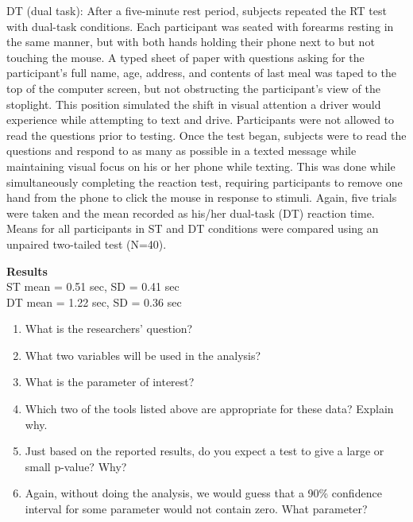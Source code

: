 \begin{alist}
\begin{list}{}{}
    DT (dual task): After a five-minute rest period, subjects repeated
    the RT test with dual-task conditions. Each participant was seated
    with forearms resting in the same manner, but with both hands
    holding their phone next to but not touching the mouse. A typed
    sheet of paper with questions asking for the participant’s full
    name, age, address, and contents of last meal was taped to the top
    of the computer screen, but not obstructing the participant’s view
    of the stoplight.  This position simulated the shift in visual
    attention a driver would experience while attempting to text and
    drive. Participants were not allowed to read the questions prior
    to testing. Once the test began, subjects were to read the
    questions and respond to as many as possible in a texted message
    while maintaining visual focus on his or her phone while
    texting. This was done while simultaneously completing the
    reaction test, requiring participants to remove one hand from the
    phone to click the mouse in response to stimuli. Again, five
    trials were taken and the mean recorded as his/her dual-task (DT)
    reaction time.  Means for all participants in ST and DT conditions
    were compared using an unpaired two-tailed test (N=40).
  \item [\bf  Results]\ \ \\
   ST mean = 0.51 sec, SD = 0.41 sec\\
   DT mean = 1.22 sec, SD = 0.36 sec
 \end{list}
   \begin{enumerate}
   \item What is the researchers' question?\vspace{1cm}
   \item What two variables will be used in the analysis?\vspace{1cm}
   \item What is the parameter of interest?\vspace{1cm}
   \item Which two of the tools listed above are appropriate for these
     data? Explain why.\vspace{2cm}
   \item Just based on the reported results, do you expect a test to
     give a large or small p-value?  Why?\vspace{1cm}
   \item Again, without doing the analysis, we would guess that a 90\%
     confidence interval for some parameter would not contain zero.  What
     parameter? \vspace{1cm}
  \end{enumerate}


\end{alist}
